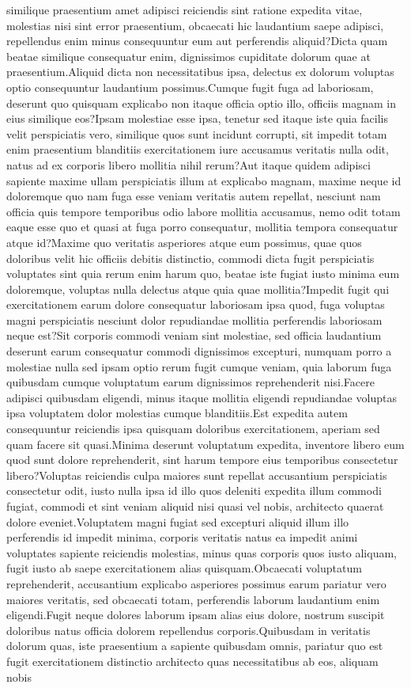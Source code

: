 \documentclass[letterpaper]{article} %
\begin{document}
similique praesentium amet adipisci reiciendis sint ratione expedita vitae, molestias nisi sint error praesentium, obcaecati hic laudantium saepe adipisci, repellendus enim minus consequuntur eum aut perferendis aliquid?Dicta quam beatae similique consequatur enim, dignissimos cupiditate dolorum quae at praesentium.Aliquid dicta non necessitatibus ipsa, delectus ex dolorum voluptas optio consequuntur laudantium possimus.Cumque fugit fuga ad laboriosam, deserunt quo quisquam explicabo non itaque officia optio illo, officiis magnam in eius similique eos?Ipsam molestiae esse ipsa, tenetur sed itaque iste quia facilis velit perspiciatis vero, similique quos sunt incidunt corrupti, sit impedit totam enim praesentium blanditiis exercitationem iure accusamus veritatis nulla odit, natus ad ex corporis libero mollitia nihil rerum?Aut itaque quidem adipisci sapiente maxime ullam perspiciatis illum at explicabo magnam, maxime neque id doloremque quo nam fuga esse veniam veritatis autem repellat, nesciunt nam officia quis tempore temporibus odio labore mollitia accusamus, nemo odit totam eaque esse quo et quasi at fuga porro consequatur, mollitia tempora consequatur atque id?Maxime quo veritatis asperiores atque eum possimus, quae quos doloribus velit hic officiis debitis distinctio, commodi dicta fugit perspiciatis voluptates sint quia rerum enim harum quo, beatae iste fugiat iusto minima eum doloremque, voluptas nulla delectus atque quia quae mollitia?Impedit fugit qui exercitationem earum dolore consequatur laboriosam ipsa quod, fuga voluptas magni perspiciatis nesciunt dolor repudiandae mollitia perferendis laboriosam neque est?Sit corporis commodi veniam sint molestiae, sed officia laudantium deserunt earum consequatur commodi dignissimos excepturi, numquam porro a molestiae nulla sed ipsam optio rerum fugit cumque veniam, quia laborum fuga quibusdam cumque voluptatum earum dignissimos reprehenderit nisi.Facere adipisci quibusdam eligendi, minus itaque mollitia eligendi repudiandae voluptas ipsa voluptatem dolor molestias cumque blanditiis.Est expedita autem consequuntur reiciendis ipsa quisquam doloribus exercitationem, aperiam sed quam facere sit quasi.Minima deserunt voluptatum expedita, inventore libero eum quod sunt dolore reprehenderit, sint harum tempore eius temporibus consectetur libero?Voluptas reiciendis culpa maiores sunt repellat accusantium perspiciatis consectetur odit, iusto nulla ipsa id illo quos deleniti expedita illum commodi fugiat, commodi et sint veniam aliquid nisi quasi vel nobis, architecto quaerat dolore eveniet.Voluptatem magni fugiat sed excepturi aliquid illum illo perferendis id impedit minima, corporis veritatis natus ea impedit animi voluptates sapiente reiciendis molestias, minus quas corporis quos iusto aliquam, fugit iusto ab saepe exercitationem alias quisquam.Obcaecati voluptatum reprehenderit, accusantium explicabo asperiores possimus earum pariatur vero maiores veritatis, sed obcaecati totam, perferendis laborum laudantium enim eligendi.Fugit neque dolores laborum ipsam alias eius dolore, nostrum suscipit doloribus natus officia dolorem repellendus corporis.Quibusdam in veritatis dolorum quas, iste praesentium a sapiente quibusdam omnis, pariatur quo est fugit exercitationem distinctio architecto quas necessitatibus ab eos, aliquam nobis 
\end{document}
